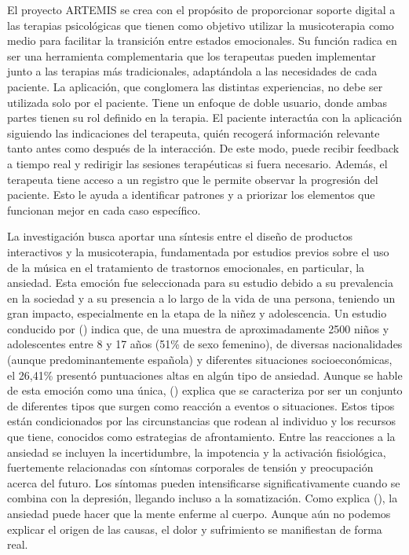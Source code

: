 El proyecto ARTEMIS se crea con el propósito de proporcionar soporte digital a las terapias psicológicas que tienen como objetivo utilizar la musicoterapia como medio para facilitar la transición entre estados emocionales. Su función radica en ser una herramienta complementaria que los terapeutas pueden implementar junto a las terapias más tradicionales, adaptándola a las necesidades de cada paciente. La aplicación, que conglomera las distintas experiencias, no debe ser utilizada solo por el paciente. Tiene un enfoque de doble usuario, donde ambas partes tienen su rol definido en la terapia. El paciente interactúa con la aplicación siguiendo las indicaciones del terapeuta, quién recogerá información relevante tanto antes como después de la interacción. De este modo, puede recibir feedback a tiempo real y redirigir las sesiones terapéuticas si fuera necesario. Además, el terapeuta tiene acceso a un registro que le permite observar la progresión del paciente. Esto le ayuda a identificar patrones y a priorizar los elementos que funcionan mejor en cada caso específico.

La investigación busca aportar una síntesis entre el diseño de productos interactivos y la musicoterapia, fundamentada por estudios previos sobre el uso de la música en el tratamiento de trastornos emocionales, en particular, la ansiedad. Esta emoción fue seleccionada para su estudio debido a su prevalencia en la sociedad y a su presencia a lo largo de la vida de una persona, teniendo un gran impacto, especialmente en la etapa de la niñez y adolescencia. Un estudio conducido por \citeauthor{MO:2012} (\citeyear{MO:2012}) indica que, de una muestra de aproximadamente 2500 niños y adolescentes entre 8 y 17 años (51\% de sexo femenino), de diversas nacionalidades (aunque predominantemente española) y diferentes situaciones socioeconómicas, el 26,41\% presentó puntuaciones altas en algún tipo de ansiedad. Aunque se hable de esta emoción como una única, \citeauthor{CAGD:2010} (\citeyear{CAGD:2010}) explica que se caracteriza por ser un conjunto de diferentes tipos que surgen como reacción a eventos o situaciones. Estos tipos están condicionados por las circunstancias que rodean al individuo y los recursos que tiene, conocidos como estrategias de afrontamiento. Entre las reacciones a la ansiedad se incluyen la incertidumbre, la impotencia y la activación fisiológica, fuertemente relacionadas con síntomas corporales de tensión y preocupación acerca del futuro. Los síntomas pueden intensificarse significativamente cuando se combina con la depresión, llegando incluso a la somatización. Como explica \citeauthor{CJI:2017} (\citeyear{CJI:2017}), la ansiedad puede hacer que la mente enferme al cuerpo. Aunque aún no podemos explicar el origen de las causas, el dolor y sufrimiento se manifiestan de forma real. 

